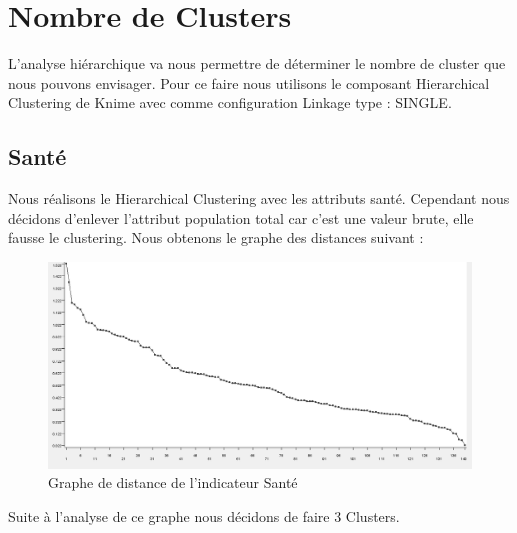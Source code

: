 \section{Nombre de Clusters}
L'analyse hiérarchique va nous permettre de déterminer le nombre de cluster que nous pouvons envisager. Pour ce faire nous utilisons le composant Hierarchical Clustering de Knime avec comme configuration Linkage type : SINGLE.

\subsection{Santé}
Nous réalisons le Hierarchical Clustering avec les attributs santé. Cependant nous décidons d'enlever l'attribut population total car c'est une valeur brute, elle fausse le clustering. Nous obtenons le graphe des distances suivant : 

\begin{figure}[H]
	\begin{center}
		\includegraphics[scale=0.5]{Image/DistanceSanteNoMissing2}
		\caption{Graphe de distance de l'indicateur Santé \jeuc}
	\end{center}
\end{figure}

Suite à l'analyse de ce graphe nous décidons de faire 3 Clusters.

